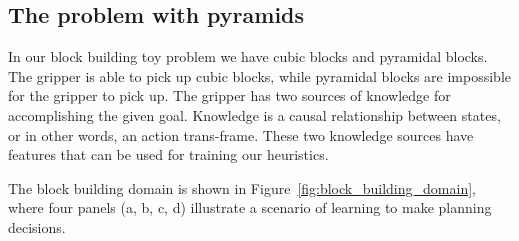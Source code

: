 \documentclass[twoside,letterpaper,11pt]{article}
\begin{document}
\subsection{The problem with pyramids}

In our block building toy problem we have cubic blocks and pyramidal
blocks.  The gripper is able to pick up cubic blocks, while pyramidal
blocks are impossible for the gripper to pick up.  The gripper has two
sources of knowledge for accomplishing the given goal.  Knowledge is a
causal relationship between states, or in other words, an action
trans-frame.  These two knowledge sources have features that can be
used for training our heuristics.  

The block building domain is shown in
Figure~\ref{fig:block_building_domain}, where four panels (a, b, c, d)
illustrate a scenario of learning to make planning decisions.
\end{document}
